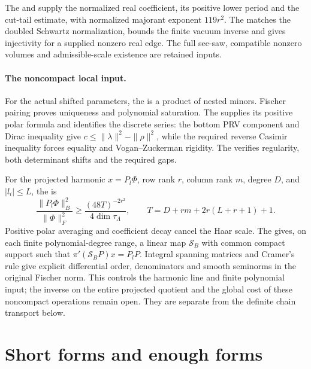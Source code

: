 The  and
supply the normalized real coefficient, its positive lower period and
the cut-tail estimate, with normalized majorant exponent \(119r^2\).
The  matches the doubled Schwartz normalization, bounds the finite
vacuum inverse and gives injectivity for a supplied nonzero real edge.
The full see-saw, compatible nonzero volumes and admissible-scale
existence are retained inputs.

\paragraph{The noncompact local input.}
For the actual shifted parameters, the
is a product of nested minors. Fischer pairing proves uniqueness and
polynomial saturation. The
 supplies its positive polar formula and identifies
the discrete series: the bottom PRV component and Dirac inequality give
\(c\le\|\lambda\|^2-\|\rho\|^2\), while the required reverse
Casimir inequality forces equality and Vogan--Zuckerman rigidity.
The 
verifies regularity, both determinant shifts and the required gaps.

For the projected harmonic \(x=P_l\Phi\), row rank \(r\), column
rank \(m\), degree \(D\), and \(|l_i|\le L\), the
 is
\[
 \frac{\|P_l\Phi\|_B^2}{\|\Phi\|_F^2}
 \ge\frac{(48T)^{-2r^2}}{4\dim\tau_\Lambda},
 \qquad T=D+rm+2r(L+r+1)+1.
\]
Positive polar averaging and coefficient decay cancel the Haar scale.
The  gives, on each finite polynomial-degree range, a linear
map \(\mathcal S_B\) with common compact support such that
\(\pi'(\mathcal S_BP)x=P_lP\). Integral spanning matrices and
Cramer's rule give explicit differential order, denominators and smooth
seminorms in the original Fischer norm. This controls the harmonic line
and finite polynomial input; the inverse on the entire projected
quotient and the global cost of these noncompact operations remain open.
They are separate from the definite chain transport below.

\section{Short forms and enough forms}

